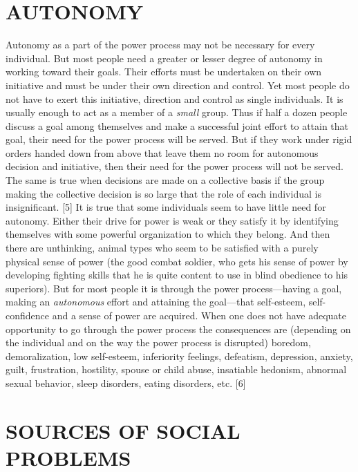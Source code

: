 \chapter{AUTONOMY}

 Autonomy as a part of the power process may not be necessary for every individual. But most people need a greater or lesser degree of autonomy in working toward their goals. Their efforts must be undertaken on their own initiative and must be under their own direction and control. Yet most people do not have to exert this initiative, direction and control as single individuals. It is usually enough to act as a member of a {\em small} group. Thus if half a dozen people discuss a goal among themselves and make a successful joint effort to attain that goal, their need for the power process will be served. But if they work under rigid orders handed down from above that leave them no room for autonomous decision and initiative, then their need for the power process will not be served. The same is true when decisions are made on a collective basis if the group making the collective decision is so large that the role of each individual is insignificant. [5]
 It is true that some individuals seem to have little need for autonomy. Either their drive for power is weak or they satisfy it by identifying themselves with some powerful organization to which they belong. And then there are unthinking, animal types who seem to be satisfied with a purely physical sense of power (the good combat soldier, who gets his sense of power by developing fighting skills that he is quite content to use in blind obedience to his superiors).
 But for most people it is through the power process—having a goal, making an {\em autonomous} effort and attaining the goal—that self-esteem, self-confidence and a sense of power are acquired. When one does not have adequate opportunity to go through the power process the consequences are (depending on the individual and on the way the power process is disrupted) boredom, demoralization, low self-esteem, inferiority feelings, defeatism, depression, anxiety, guilt, frustration, hostility, spouse or child abuse, insatiable hedonism, abnormal sexual behavior, sleep disorders, eating disorders, etc. [6]

\chapter{SOURCES OF SOCIAL PROBLEMS}

